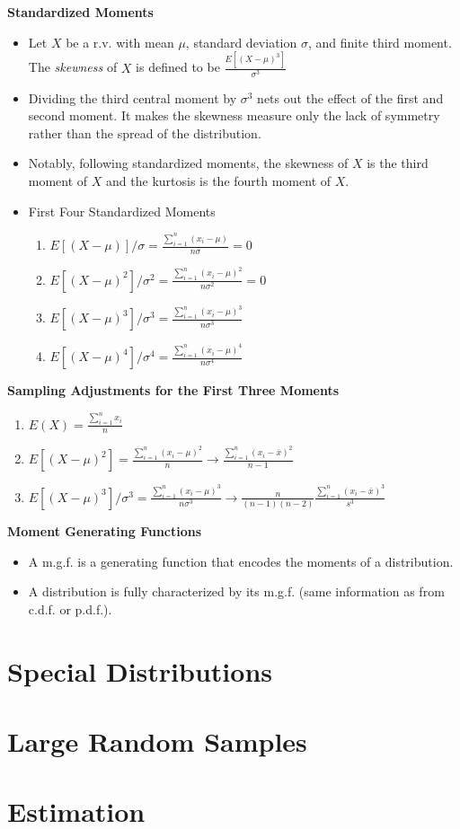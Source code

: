 \documentclass[11pt]{article}
\begin{document}
\textbf{Standardized Moments}
\begin{itemize}
    \item Let $X$ be a r.v. with mean $\mu$, standard deviation $\sigma$, and finite third 
    moment. The \textit{skewness} of $X$  is defined to be $\frac{E[{(X-\mu)}^3]}{\sigma^3}$
    \item Dividing the third central moment by $\sigma^3$ nets out the effect of the first and 
    second moment. It makes the skewness measure only the lack of symmetry rather than the 
    spread of the distribution. 
    \item Notably, following standardized moments, the skewness of $X$ is the third moment of 
    $X$ and the kurtosis is the fourth moment of $X$.
    \item First Four Standardized Moments
    \begin{enumerate}
        \item $E[(X-\mu)]/\sigma=\frac{\sum_{i=1}^{n} (x_i-\mu)}{n\sigma}=0$
        \item $E[{(X-\mu)}^2]/\sigma^2=\frac{\sum_{i=1}^{n} {(x_i-\mu)}^2}{n\sigma^2}=0$
        \item $E[{(X-\mu)}^3]/\sigma^3=\frac{\sum_{i=1}^{n} {(x_i-\mu)}^3}{n\sigma^3}$
        \item $E[{(X-\mu)}^4]/\sigma^4=\frac{\sum_{i=1}^{n} {(x_i-\mu)}^4}{n\sigma^4}$
    \end{enumerate}
\end{itemize}

\textbf{Sampling Adjustments for the First Three Moments}
\begin{enumerate}
    \item $E(X)=\frac{\sum_{i=1}^{n} x_i}{n}$
    \item $E[{(X-\mu)}^2]=\frac{\sum_{i=1}^{n} {(x_i-\mu)}^2}{n} \to \frac{\sum_{i=1}^{n} {(x_i-\bar{x})}^2}{n-1}$
    \item $E[{(X-\mu)}^3]/\sigma^3=\frac{\sum_{i=1}^{n} {(x_i-\mu)}^3}{n\sigma^3} \to \frac{n}{(n-1)(n-2)}\frac{\sum_{i=1}^{n} {(x_i-\bar{x})}^3}{s^3}$
\end{enumerate}

\textbf{Moment Generating Functions}
\begin{itemize}
    \item A m.g.f. is a generating function that encodes the moments of a distribution.
    \item A distribution is fully characterized by its m.g.f. (same information as from c.d.f.
    or p.d.f.).
\end{itemize}


\section{Special Distributions}
\section{Large Random Samples}

\section{Estimation}
\end{document}
